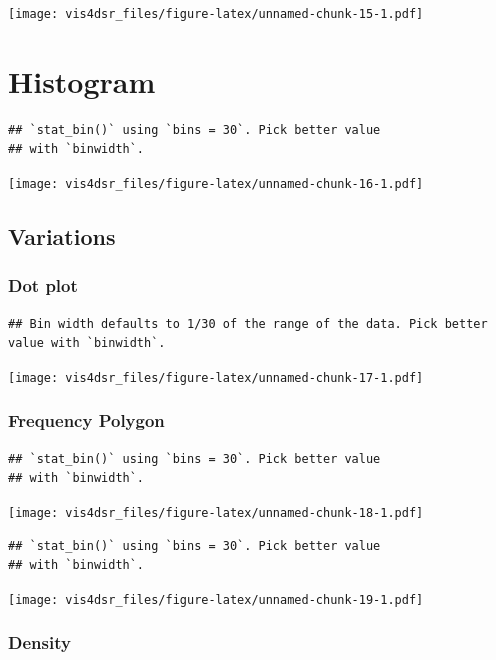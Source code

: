 \documentclass[
]{krantz}
\begin{document}
\texttt{[image: vis4dsr\_files/figure-latex/unnamed-chunk-15-1.pdf]}

\hypertarget{histogram}{%
\section{Histogram}\label{histogram}}

\begin{verbatim}
## `stat_bin()` using `bins = 30`. Pick better value
## with `binwidth`.
\end{verbatim}

\texttt{[image: vis4dsr\_files/figure-latex/unnamed-chunk-16-1.pdf]}

\hypertarget{variations-5}{%
\subsection{Variations}\label{variations-5}}

\hypertarget{dot-plot}{%
\subsubsection{Dot plot}\label{dot-plot}}

\begin{verbatim}
## Bin width defaults to 1/30 of the range of the data. Pick better value with `binwidth`.
\end{verbatim}

\texttt{[image: vis4dsr\_files/figure-latex/unnamed-chunk-17-1.pdf]}

\hypertarget{frequency-polygon}{%
\subsubsection{Frequency Polygon}\label{frequency-polygon}}

\begin{verbatim}
## `stat_bin()` using `bins = 30`. Pick better value
## with `binwidth`.
\end{verbatim}

\texttt{[image: vis4dsr\_files/figure-latex/unnamed-chunk-18-1.pdf]}

\begin{verbatim}
## `stat_bin()` using `bins = 30`. Pick better value
## with `binwidth`.
\end{verbatim}

\texttt{[image: vis4dsr\_files/figure-latex/unnamed-chunk-19-1.pdf]}

\hypertarget{density}{%
\subsubsection{Density}\label{density}}
\end{document}
